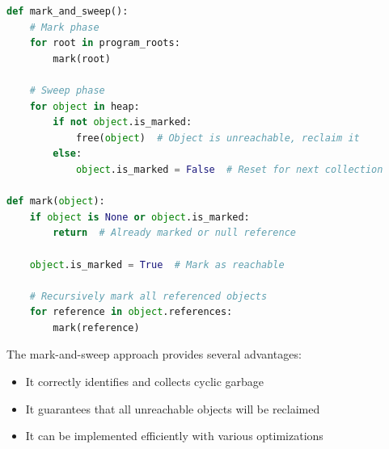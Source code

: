 \begin{lstlisting}[language=Python, caption=Mark-and-Sweep Algorithm, style=pythonstyle]
def mark_and_sweep():
    # Mark phase
    for root in program_roots:
        mark(root)
    
    # Sweep phase
    for object in heap:
        if not object.is_marked:
            free(object)  # Object is unreachable, reclaim it
        else:
            object.is_marked = False  # Reset for next collection

def mark(object):
    if object is None or object.is_marked:
        return  # Already marked or null reference
    
    object.is_marked = True  # Mark as reachable
    
    # Recursively mark all referenced objects
    for reference in object.references:
        mark(reference)
\end{lstlisting}

The mark-and-sweep approach provides several advantages:
\begin{itemize}
    \item It correctly identifies and collects cyclic garbage
    \item It guarantees that all unreachable objects will be reclaimed
    \item It can be implemented efficiently with various optimizations
\end{itemize}